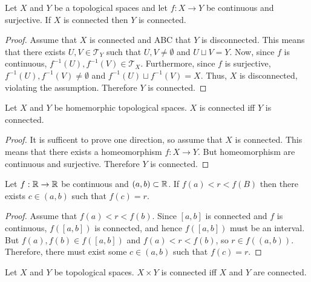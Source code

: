 \documentclass[letterpaper,12pt,fleqn]{article}
\newcommand{\T}{\mathscr{T}}
\begin{document}
\begin{theorem}[8.9]
  Let \(X\) and \(Y\) be a topological spaces and let \(f:X\to Y\) be continuous and surjective.  If \(X\) is
  connected then \(Y\) is connected.
\end{theorem}

\begin{proof}
  Assume that \(X\) is connected and ABC that \(Y\) is disconnected.  This means that there exists \(U,V\in\T_Y\)
  such that \(U,V\ne\emptyset\) and \(U\sqcup V=Y\).  Now, since \(f\) is continuous, \(f^{-1}(U),f^{-1}(V)\in\T_X\).
  Furthermore, since \(f\) is surjective, \(f^{-1}(U),f^{-1}(V)\ne\emptyset\) and \(f^{-1}(U)\sqcup f^{-1}(V)=X\).
  Thus, \(X\) is disconnected, violating the assumption.  Therefore \(Y\) is connected.
\end{proof}

\begin{corollary}
  Let \(X\) and \(Y\) be homemorphic topological spaces.  \(X\) is connected iff \(Y\) is connected.
\end{corollary}

\begin{proof}
  It is sufficent to prove one direction, so assume that \(X\) is connected.  This means that there exists a
  homeomorphism \(f:X\to Y\).  But homeomorphism are continuous and surjective.  Therefore \(Y\) is connected.
\end{proof}

\begin{theorem}[8.10]
  Let \(f:\mathbb{R}\to\mathbb{R}\) be continuous and \((a,b)\subset\mathbb{R}\).  If \(f(a)<r<f(B)\) then there exists \(c\in(a,b)\)
  such that \(f(c)=r\).
\end{theorem}

\begin{proof}
  Assume that \(f(a)<r<f(b)\).  Since \([a,b]\) is connected and \(f\) is continuous, \(f([a,b])\) is connected,
  and hence \(f([a,b])\) must be an interval.  But \(f(a),f(b)\in f([a,b])\) and \(f(a)<r<f(b)\), so \(r\in
  f((a,b))\).  Therefore, there must exist some \(c\in(a,b)\) such that \(f(c)=r\).
\end{proof}

\begin{theorem}[8.11]
  Let \(X\) and \(Y\) be topological spaces.  \(X\times Y\) is connected iff \(X\) and \(Y\) are connected.
\end{theorem}
\end{document}
